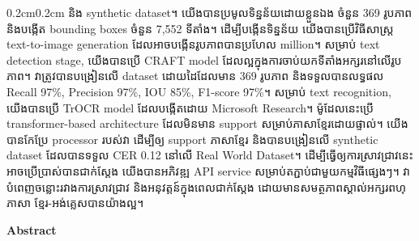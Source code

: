 \begin{adjustwidth}{0.2cm}{0.2cm}
    និង 
    {\englishfont\fontsize{13.5pt}{20pt}\selectfont synthetic dataset}។ 
    យើងបានប្រមូលទិន្នន័យដោយខ្លួនឯង ចំនួន 369 រូបភាព និងបង្កើត bounding boxes 
    ចំនួន 7,552 ទីតាំង។ 
    ដើម្បីបង្កើនទិន្នន័យ យើងបានប្រើវិធីសាស្ត្រ 
    {\englishfont\fontsize{13.5pt}{20pt}\selectfont text-to-image generation} 
    ដែលអាចបង្កើនរូបភាពបានប្រហែល 
    {\englishfont\fontsize{13.5pt}{20pt} million}។ សម្រាប់ 
    {\englishfont\fontsize{13.5pt}{20pt}\selectfont text detection stage}, 
    យើងបានប្រើ 
    {\englishfont\fontsize{13.5pt}{20pt}\selectfont CRAFT model} 
    ដែលល្អក្នុងការចាប់យកទីតាំងអក្សរនៅលើរូបភាព។ 
    វាត្រូវបានបង្រៀនលើ dataset ដោយដៃដែលមាន 369 រូបភាព 
    និងទទួលបានលទ្ធផល 
    {\englishfont\fontsize{13.5pt}{20pt}\selectfont Recall 97\%, Precision 97\%, IOU 85\%, F1-score 97\%}។ 
    សម្រាប់ 
    {\englishfont\fontsize{13.5pt}{20pt}\selectfont text recognition}, 
    យើងបានប្រើ 
    {\englishfont\fontsize{13.5pt}{20pt}\selectfont TrOCR model} 
    ដែលបង្កើតដោយ 
    {\englishfont\fontsize{13.5pt}{20pt}\selectfont Microsoft Research}។ 
    ម៉ូដែលនេះប្រើ 
    {\englishfont\fontsize{13.5pt}{20pt}\selectfont transformer-based architecture} 
    ដែលមិនមាន support សម្រាប់ភាសាខ្មែរដោយផ្ទាល់។ 
    យើងបានកែប្រែ 
    {\englishfont\fontsize{13.5pt}{20pt}\selectfont processor} 
    របស់វា ដើម្បីឲ្យ support ភាសាខ្មែរ 
    និងបានបង្រៀនលើ 
    {\englishfont\fontsize{13.5pt}{20pt}\selectfont synthetic dataset} 
    ដែលបានទទួល 
    {\englishfont\fontsize{13.5pt}{20pt}\selectfont CER 0.12} 
    នៅលើ 
    {\englishfont\fontsize{13.5pt}{20pt}\selectfont Real World Dataset}។ ដើម្បីធ្វើឲ្យការស្រាវជ្រាវនេះអាចប្រើប្រាស់បានជាក់ស្តែង 
    យើងបានអភិវឌ្ឍ 
    {\englishfont\fontsize{13.5pt}{20pt}\selectfont API service} 
    សម្រាប់តភ្ជាប់ជាមួយកម្មវិធីផ្សេងៗ។ 
    វាបំពេញចន្លោះរវាងការស្រាវជ្រាវ និងអនុវត្តន៍ក្នុងពេលជាក់ស្តែង 
    ដោយមានសមត្ថភាពស្គាល់អក្សរពហុភាសា ខ្មែរ-អង់គ្លេសបានយ៉ាងល្អ។
    \vspace{2cm}
    
    \clearpage
    \begin{center}
        {\bfseries\large Abstract}
    \end{center}

    \vspace{-0.2cm}
    \setlength{\parindent}{0pt}
    \vspace{0.3cm}



\end{adjustwidth}
